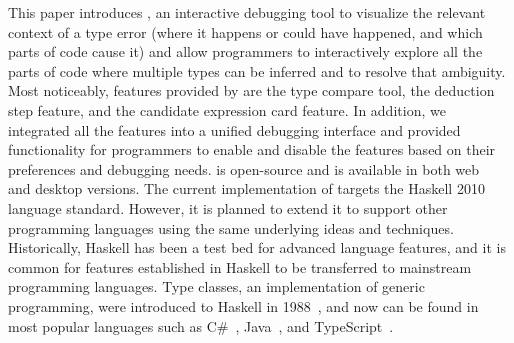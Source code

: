 This paper introduces \chameleon{}, an interactive debugging tool to visualize the relevant context of a type error (where it happens or could have happened, and which parts of code cause it) and allow programmers to interactively explore all the parts of code where multiple types can be inferred and to resolve that ambiguity. Most noticeably, features provided by \chameleon{} are the type compare tool, the deduction step feature, and the candidate expression card feature.  In addition, we integrated all the features into a unified debugging interface and provided functionality for programmers to enable and disable the features based on their preferences and debugging needs. \chameleon{} is open-source and is available in both web~\cite{shuai_fu_chameleon_2022} and desktop versions.   The current implementation of \chameleon{} targets the Haskell 2010 language standard. However, it is planned to extend it to support other programming languages using the same underlying ideas and techniques. Historically, Haskell has been a test bed for advanced language features, and it is common for features established in Haskell to be transferred to mainstream programming languages. Type classes, an implementation of generic programming, were introduced to Haskell in 1988~\cite{hudak_history_2007}, and now can be found in most popular languages such as C\#~\cite{bill_wagner_constraints_2022}, Java~\cite{oracle_generic_2022}, and TypeScript~\cite{microsoft_documentation_2022}.


